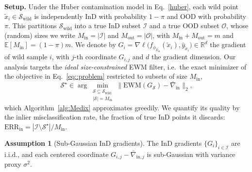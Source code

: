 \documentclass[10pt]{article} %
\theoremstyle{plain}
\theoremstyle{definition}
\newtheorem{assumption}[theorem]{Assumption}
\begin{document}
\textbf{Setup.}
Under the Huber contamination model in Eq.~\ref{huber}, each wild point
$\tilde{x}_i \in \mathcal{S}_{\mathrm{wild}}$ is independently InD with probability
$1-\pi$ and OOD with probability $\pi$. This partitions $\mathcal{S}_{\mathrm{wild}}$
into a true InD subset $\mathcal{I}$ and a true OOD subset $\mathcal{O}$, whose (random) sizes we write
$M_{\mathrm{in}} = |\mathcal{I}|$ and $M_{\mathrm{out}} = |\mathcal{O}|$, with
$M_{\mathrm{in}} + M_{\mathrm{out}} = m$ and $\mathbb{E}[M_{\mathrm{in}}] = (1-\pi)m$.
We denote by $G_i = \nabla\ell\big(f_{\phi_{\mathcal{S}_{\mathrm{in}}}}(\tilde{x}_i),
\hat{y}_{\tilde{x}_i}\big) \in \mathbb{R}^d$ the gradient of wild sample $i$, with
$j$-th coordinate $G_{i,j}$ and $d$ the gradient dimension. Our analysis targets the
\emph{ideal size-constrained} EWM filter, i.e.\ the exact minimizer of the objective in
Eq.~\ref{eq::problem} restricted to subsets of size $M_{\mathrm{in}}$,
\begin{equation}
  \mathcal{S}^\star \in \arg\min_{\substack{\mathcal{S} \subseteq \mathcal{S}_{\mathrm{wild}} \\ |\mathcal{S}| = M_{\mathrm{in}}}}
  \big\| \mathrm{EWM}(G_\mathcal{S}) - \bar{\nabla}_{\mathrm{in}} \big\|_2 ,
  \label{eq:ideal-filter}
\end{equation}
which Algorithm~\ref{alg:Medix} approximates greedily.
We quantify its quality by the inlier misclassification rate, the fraction of true
InD points it discards: $\mathrm{ERR}_{\mathrm{in}} = |\mathcal{I} \setminus \mathcal{S}^\star| / M_{\mathrm{in}}$.

\vspace{1em}


\begin{assumption}[Sub-Gaussian InD gradients]
\label{ass:subgauss}
The InD gradients $\{G_i\}_{i \in \mathcal{I}}$ are i.i.d., and each centered coordinate
$G_{i,j} - \bar{\nabla}_{\mathrm{in},j}$ is sub-Gaussian with variance proxy $\sigma^2$.
\end{assumption}

\vspace{1em}
\end{document}
